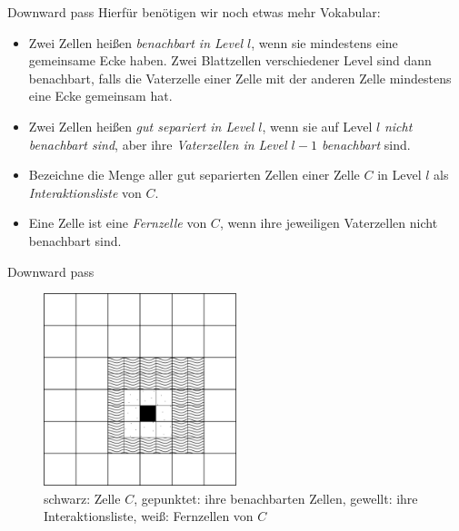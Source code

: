 \documentclass[ngerman]{beamer}
\begin{document}
\begin{frame}{Downward pass}
Hierfür benötigen wir noch etwas mehr Vokabular:
\begin{Definition}
\begin{itemize}
\item Zwei Zellen heißen \emph{benachbart in Level $l$}, wenn sie mindestens eine gemeinsame Ecke haben. Zwei Blattzellen verschiedener Level sind dann benachbart, falls die Vaterzelle einer Zelle mit der anderen Zelle mindestens eine Ecke gemeinsam hat.
\item Zwei Zellen heißen \emph{gut separiert in Level $l$}, wenn sie auf Level $l$ \emph{nicht benachbart sind}, aber ihre \emph{Vaterzellen in Level $l-1$ benachbart} sind.
\item Bezeichne die Menge aller gut separierten Zellen einer Zelle $C$ in Level $l$ als \emph{Interaktionsliste} von $C$.
\item Eine Zelle ist eine \emph{Fernzelle} von $C$, wenn ihre jeweiligen Vaterzellen nicht benachbart sind.
\end{itemize}
\end{Definition}
\end{frame}

\begin{frame}{Downward pass}
\begin{figure}
\includegraphics[width=0.5\textwidth]{intlist.png}
\caption{schwarz: Zelle $C$, gepunktet: ihre benachbarten Zellen, \linebreak gewellt: ihre Interaktionsliste, weiß: Fernzellen von $C$}
\end{figure}
\end{frame}
\end{document}
